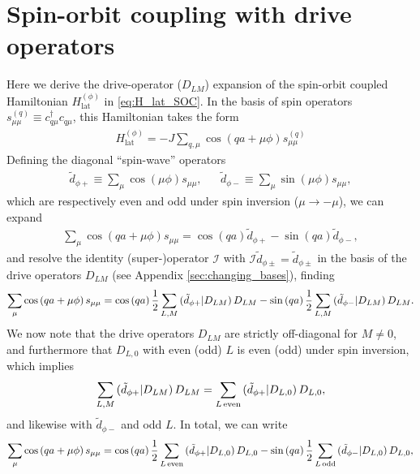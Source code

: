 \documentclass[nofootinbib,notitlepage,11pt]{revtex4-2}
\renewcommand{\t}{\text} %
\newcommand{\f}[2]{\dfrac{#1}{#2}} %
\newcommand{\p}[1]{\left(#1\right)} %
\newcommand{\1}{\mathds{1}}
\newcommand{\I}{\mathcal{I}}
\def\obk#1{\mathinner{({#1})}}
\begin{document}
\section{Spin-orbit coupling with drive operators}
\label{sec:lat_drive}

Here we derive the drive-operator ($D_{LM}$) expansion of the
spin-orbit coupled Hamiltonian $H_{\t{lat}}^{(\phi)}$ in
\eqref{eq:H_lat_SOC}.  In the basis of spin operators
$s_{\mu\mu}^{(q)} \equiv c_{q\mu}^\dag c_{q\mu}$, this Hamiltonian
takes the form
\begin{align}
  H_{\t{lat}}^{(\phi)}
  = -J \sum_{q,\mu} \cos\p{qa+\mu\phi} s_{\mu\mu}^{(q)}
  \label{eq:H_lat_spin}
\end{align}
Defining the diagonal ``spin-wave'' operators
\begin{align}
  \tilde d_{\phi+} \equiv \sum_\mu \cos\p{\mu\phi} s_{\mu\mu},
  &&
  \tilde d_{\phi-} \equiv \sum_\mu \sin\p{\mu\phi} s_{\mu\mu},
\end{align}
which are respectively even and odd under spin inversion
($\mu\to-\mu$), we can expand
\begin{align}
  \sum_\mu \cos\p{qa+\mu\phi} s_{\mu\mu}
  = \cos\p{qa} \tilde d_{\phi+} - \sin\p{qa} \tilde d_{\phi-},
\end{align}
and resolve the identity (super-)operator $\I$ with
$\I \tilde d_{\phi\pm} = \tilde d_{\phi\pm}$ in the basis of the drive operators
$D_{LM}$ (see Appendix \ref{sec:changing_bases}), finding
\begin{align}
  \sum_\mu \cos\p{qa+\mu\phi} s_{\mu\mu}
  = \cos\p{qa} \f12 \sum_{L,M} \obk{\tilde d_{\phi+}|D_{LM}} D_{LM}
  - \sin\p{qa} \f12 \sum_{L,M} \obk{\tilde d_{\phi-}|D_{LM}} D_{LM}.
\end{align}
We now note that the drive operators $D_{LM}$ are strictly
off-diagonal for $M\ne0$, and furthermore that $D_{L,0}$ with even
(odd) $L$ is even (odd) under spin inversion, which implies
\begin{align}
  \sum_{L,M} \obk{\tilde d_{\phi+}|D_{LM}} D_{LM}
  = \sum_{L\,\t{even}} \obk{\tilde d_{\phi+}|D_{L,0}} D_{L,0},
\end{align}
and likewise with $\tilde d_{\phi-}$ and odd $L$.  In total, we can
write
\begin{align}
  \sum_\mu \cos\p{qa+\mu\phi} s_{\mu\mu}
  = \cos\p{qa} \f12 \sum_{L\,\t{even}}
  \obk{\tilde d_{\phi+}|D_{L,0}} D_{L,0}
  - \sin\p{qa} \f12 \sum_{L\,\t{odd}}
  \obk{\tilde d_{\phi-}|D_{L,0}} D_{L,0},
\end{align}
\end{document}
